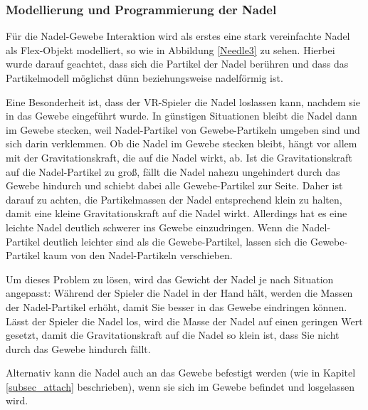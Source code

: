 \subsubsection{Modellierung und Programmierung der Nadel}
Für die Nadel-Gewebe Interaktion wird als erstes eine stark vereinfachte Nadel als Flex-Objekt modelliert, so wie in Abbildung \ref{Needle3} zu sehen. Hierbei wurde darauf geachtet, dass sich die Partikel der Nadel berühren und dass das Partikelmodell möglichst dünn beziehungsweise nadelförmig ist.


Eine Besonderheit ist, dass der VR-Spieler die Nadel loslassen kann, nachdem sie in das Gewebe eingeführt wurde. In günstigen Situationen bleibt die Nadel dann im Gewebe stecken, weil Nadel-Partikel von Gewebe-Partikeln umgeben sind und sich darin verklemmen. 
Ob die Nadel im Gewebe stecken bleibt, hängt vor allem mit der Gravitationskraft, die auf die Nadel wirkt, ab.
Ist die Gravitationskraft auf die Nadel-Partikel zu groß, fällt die Nadel nahezu ungehindert durch das Gewebe hindurch und schiebt dabei alle Gewebe-Partikel zur Seite. Daher ist darauf zu achten, die Partikelmassen der Nadel entsprechend klein zu halten, damit eine kleine Gravitationskraft auf die Nadel wirkt. Allerdings hat es eine leichte Nadel deutlich schwerer ins Gewebe einzudringen. Wenn die Nadel-Partikel deutlich leichter sind als die Gewebe-Partikel, lassen sich die Gewebe-Partikel kaum von den Nadel-Partikeln verschieben.

Um dieses Problem zu lösen, wird das Gewicht der Nadel je nach Situation angepasst: Während der Spieler die Nadel in der Hand hält, werden die Massen der Nadel-Partikel erhöht, damit Sie besser in das Gewebe eindringen können. Lässt der Spieler die Nadel los, wird die Masse der Nadel auf einen geringen Wert gesetzt, damit die Gravitationskraft auf die Nadel so klein ist, dass Sie nicht durch das Gewebe hindurch fällt. 

Alternativ kann die Nadel auch an das Gewebe befestigt werden (wie in Kapitel \ref{subsec_attach} beschrieben), wenn sie sich im Gewebe befindet und losgelassen wird.



